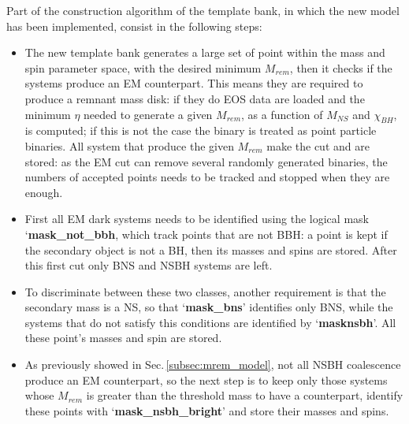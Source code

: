 \documentclass[binding=0.6cm, LaM]{sapthesis}
\begin{document}
	Part of the construction algorithm of the template bank, 
	in which the new model has been implemented, 
	consist in the following steps:
	\begin{itemize} 
	\item The new template bank generates a large set of point within the mass and spin parameter space,
        with the desired minimum $M_{rem}$, then it checks if the systems produce an EM counterpart.
        This means they are required to produce a remnant mass disk:
        if they do EOS data are loaded and the minimum $\eta$ needed to generate a given $M_{rem}$,
        as a function of $M_{NS}$ and $\chi_{BH}$,  is computed;
        if this is not the case the binary is treated as point particle binaries.
        All system that produce the given $M_{rem}$ make the cut and are stored:
        as the EM cut can remove several randomly generated binaries,
        the numbers of accepted points needs to be tracked and stopped when they are enough.
        \item First all EM dark systems needs to be identified using the logical mask ‘\textbf{{\color{red}mask\_not\_bbh}},
        which track points that are not BBH: a point is kept if the secondary object is not a BH,
        then its masses and spins are stored.
        After this first cut only BNS and NSBH systems are left.
        \item To discriminate between these two classes, another requirement is that the secondary mass is a NS,
        so that ‘\textbf{{\color{green}mask\_bns}}’ identifies only BNS, while the systems that do not satisfy this conditions
        are identified by ‘\textbf{{\color{black}masknsbh}}’.
        All these point’s masses and spin are stored.
        \item As previously showed in Sec.\,\ref{subsec:mrem_model}, not all NSBH coalescence produce an EM counterpart,
        so the next step is to keep only those systems whose $M_{rem}$ is greater than the threshold mass to have a counterpart,
        identify these points with ‘\textbf{{\color{blue}mask\_nsbh\_bright}}’ and store their masses and spins.
	\end{itemize}
		
\end{document}
